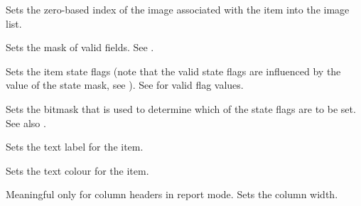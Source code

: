 Sets the zero-based index of the image associated with the item
into the image list.

\label{wxlistitemsetmask}


Sets the mask of valid fields. See .

\label{wxlistitemsetstate}


Sets the item state flags (note that the valid state flags are influenced
by the value of the state mask, see
).
See  for valid flag
values.

\label{wxlistitemsetstatemask}


Sets the bitmask that is used to determine which of the state flags
are to be set. See also .

\label{wxlistitemsettext}


Sets the text label for the item.

\label{wxlistitemsettextcolour}


Sets the text colour for the item.

\label{wxlistitemsetwidth}


Meaningful only for column headers in report mode. Sets the column width.

